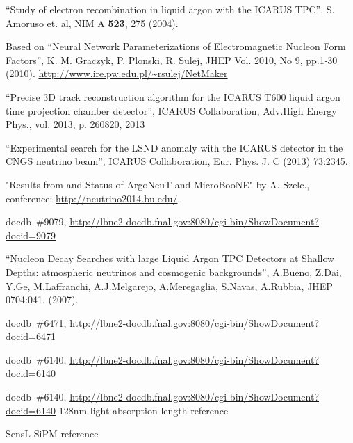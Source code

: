 \begin{thebibliography}{99}
 ``Study of electron recombination in liquid argon with the ICARUS TPC'', S. Amoruso et. al, NIM A {\bf 523}, 275 (2004). 

 Based on
``Neural Network Parameterizations of Electromagnetic Nucleon Form Factors'', K. M. Graczyk, P. Plonski, R. Sulej, JHEP Vol. 2010, No 9, pp.1-30 (2010).
\url{http://www.ire.pw.edu.pl/~rsulej/NetMaker}

``Precise 3D track reconstruction algorithm for the ICARUS T600 liquid argon time projection chamber detector'', ICARUS Collaboration, 
Adv.High Energy Phys., vol. 2013, p. 260820, 2013

 ``Experimental search for the LSND anomaly with the ICARUS
detector in the CNGS neutrino beam'', ICARUS Collaboration, Eur. Phys. J. C (2013) 73:2345.

 "Results from and Status of ArgoNeuT and MicroBooNE" by 
A. Szelc., conference: \url{http://neutrino2014.bu.edu/}.

 docdb~\#9079, \url{http://lbne2-docdb.fnal.gov:8080/cgi-bin/ShowDocument?docid=9079}

``Nucleon Decay Searches with large Liquid Argon TPC Detectors at Shallow Depths: atmospheric neutrinos and cosmogenic backgrounds'', A.Bueno, Z.Dai, Y.Ge, M.Laffranchi, A.J.Melgarejo, A.Meregaglia, S.Navas, A.Rubbia, JHEP 0704:041, (2007).

%
%
 docdb~\#6471, \url{http://lbne2-docdb.fnal.gov:8080/cgi-bin/ShowDocument?docid=6471}

 docdb~\#6140, \url{http://lbne2-docdb.fnal.gov:8080/cgi-bin/ShowDocument?docid=6140}

 docdb~\#6140, \url{http://lbne2-docdb.fnal.gov:8080/cgi-bin/ShowDocument?docid=6140}
 128nm light absorption length reference


 SensL SiPM reference



%
%


\end{thebibliography}
